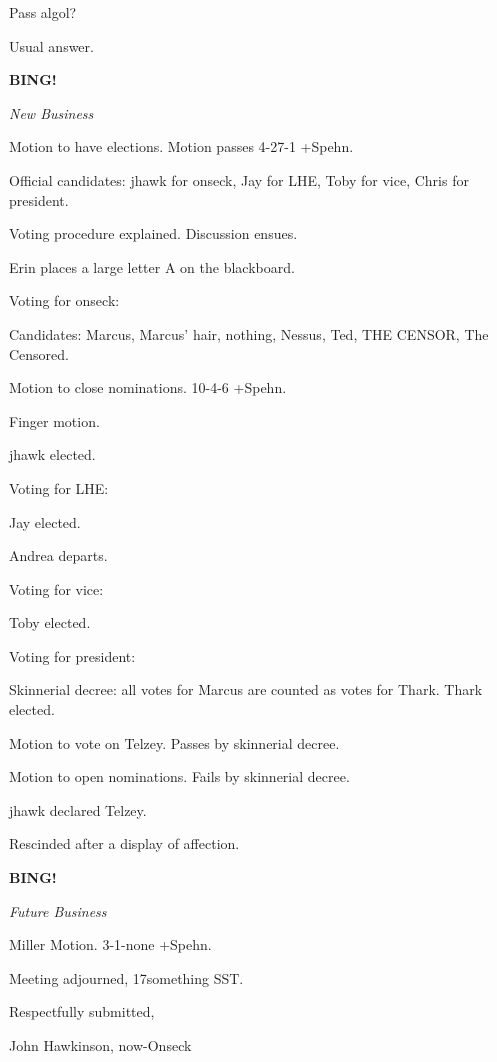 \documentclass[12pt]{article}
\newcommand{\bing}{{\bf BING!} }
\newcommand{\goto}[1]{\bing \vskip 12pt \centerline{{\em{#1}}}}
\begin{document}
Pass algol?

Usual answer.

\goto{New Business}

Motion to have elections. Motion passes 4-27-1 +Spehn.

Official candidates: jhawk for onseck, Jay for LHE, Toby for vice, Chris for president.

Voting procedure explained. Discussion ensues.

Erin places a large letter A on the blackboard.

Voting for onseck:

Candidates: Marcus, Marcus' hair, nothing, Nessus, Ted, THE CENSOR, The Censored.

Motion to close nominations. 10-4-6 +Spehn.

Finger motion.

jhawk elected.

Voting for LHE:

Jay elected.

Andrea departs.

Voting for vice:

Toby elected.

Voting for president:

Skinnerial decree: all votes for Marcus are counted as votes for Thark. Thark elected.

Motion to vote on Telzey. Passes by skinnerial decree.

Motion to open nominations. Fails by skinnerial decree.

jhawk declared Telzey.

Rescinded after a display of affection.

\goto{Future Business}

Miller Motion. 3-1-none +Spehn.

\vspace{12pt}

\noindent
Meeting adjourned, 17something SST.

\vspace{18pt}

\centerline{Respectfully submitted,}
\centerline{John Hawkinson, now-Onseck}
\end{document}

